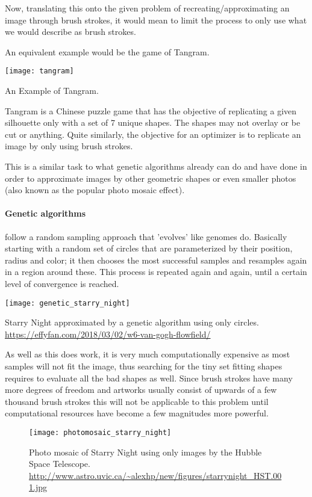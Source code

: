 Now, translating this onto the given problem of recreating/approximating an image
through brush strokes, it would mean to limit the process to only use what we would
describe as brush strokes. 

An equivalent example would be the game of Tangram.

\begin{marginfigure}
    \texttt{[image: tangram]}
    \caption[]{An Example of Tangram.}
\end{marginfigure}

Tangram is a Chinese puzzle game that has the objective of replicating a given silhouette
only with a set of 7 unique shapes.
The shapes may not overlay or be cut or anything.
Quite similarly, the objective for an optimizer is to replicate an image by only
using brush strokes.


This is a similar task to what genetic algorithms already can do and have done in
order to approximate images by other geometric shapes or even smaller photos (also 
known as the popular photo mosaic effect).
\paragraph{Genetic algorithms} follow a random sampling approach that 'evolves' like genomes do.
Basically starting with a random set of circles that are parameterized by their position,
radius and color; it then chooses the most successful samples and resamples again
in a region around these.
This process is repeated again and again, until a certain level of convergence is reached.

\begin{marginfigure}
    \texttt{[image: genetic\_starry\_night]}
    \caption[]{Starry Night approximated by a genetic algorithm using only circles. \url{https://effyfan.com/2018/03/02/w6-van-gogh-flowfield/}}
\end{marginfigure}

As well as this does work, it is very much computationally expensive as most samples
will not fit the image, thus searching for the tiny set fitting shapes requires
to evaluate all the bad shapes as well.
Since brush strokes have many more degrees of freedom and artworks usually consist
of upwards of a few thousand brush strokes this will not be applicable to this problem
until computational resources have become a few magnitudes more powerful.

\begin{figure}
    \texttt{[image: photomosaic\_starry\_night]}
    \caption[]{Photo mosaic of Starry Night using only images by the Hubble Space Telescope. \url{http://www.astro.uvic.ca/~alexhp/new/figures/starrynight_HST.001.jpg}}
\end{figure}

